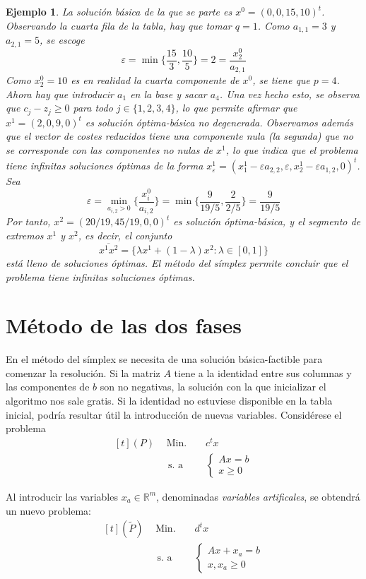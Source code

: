 \documentclass[11pt]{report}
\theoremstyle{mytheorem}
\theoremstyle{mydefinition}
\theoremstyle{myexample}
\newtheorem*{example}{Ejemplo}
\newcommand{\R}{\mathbb R}
\begin{document}
\begin{example}
La solución básica de la que se parte es $x^0 = (0,0,15,10)^t$. Observando la cuarta fila de la tabla, hay que tomar $q = 1$. Como $a_{1,1} = 3$ y $a_{2,1} = 5$, se escoge
\[\varepsilon = \min \biggl\{\frac{15}{3},\frac{10}{5} \biggr\} = 2 = \frac{x^0_2}{a_{2,1}}\]
Como $x^0_2 = 10$ es en realidad la cuarta componente de $x^0$, se tiene que $p = 4$. Ahora hay que introducir $a_1$ en la base y sacar $a_4$. Una vez hecho esto, se observa que $c_j-z_j \geq 0$ para todo $j \in \{1,2,3,4\}$, lo que permite afirmar que $x^1 = (2,0,9,0)^t$ es solución óptima-básica no degenerada. Observamos además que el vector de costes reducidos tiene una componente nula (la segunda) que no se corresponde con las componentes no nulas de $x^1$, lo que indica que el problema tiene infinitas soluciones óptimas de la forma $x^1_\varepsilon = (x^1_1-\varepsilon a_{2,2},\varepsilon,x^1_2-\varepsilon a_{1,2},0)^t$. Sea
\[\varepsilon = \min_{a_{i,2} > 0} \biggl\{\frac{x^0_i}{a_{i,2}}\biggr\} = \min \biggl\{\frac{9}{19/5},\frac{2}{2/5}\biggr\} = \frac{9}{19/5}\]
Por tanto, $x^2 = (20/19,45/19,0,0)^t$ es solución óptima-básica,
y el segmento de extremos $x^1$ y $x^2$, es decir, el conjunto
\[\overline{x^1x^2} = \{\lambda x^1+(1-\lambda)x^2 \colon \lambda \in [0,1]\}\]
está lleno de soluciones óptimas. El método del símplex permite concluir que el problema tiene infinitas soluciones óptimas.
\end{example}

\section{Método de las dos fases}

En el método del símplex se necesita de una solución básica-factible para comenzar la resolución. Si la matriz $A$ tiene a la identidad entre sus columnas y las componentes de $b$ son no negativas, la solución con la que inicializar el algoritmo nos sale gratis. Si la identidad no estuviese disponible en la tabla inicial, podría resultar útil la introducción de nuevas variables. Considérese el problema
\[\begin{aligned}[t]
(P) \ \, &\text{Min. } && c^tx \\
& \, \text{s. a} &&\begin{cases}
    Ax = b \\
    x \geq 0
\end{cases}
\end{aligned}\]

Al introducir las variables $x_a \in \R^m$, denominadas {\textit{variables artificales}}, se obtendrá un nuevo problema:
\[\begin{aligned}[t]
(\tilde{P}) \ \,&\text{Min. } && d^tx \\
& \, \text{s. a} &&\begin{cases}
    Ax +x_a= b \\
    x,x_a \geq 0
\end{cases}
\end{aligned}\]
\end{document}

